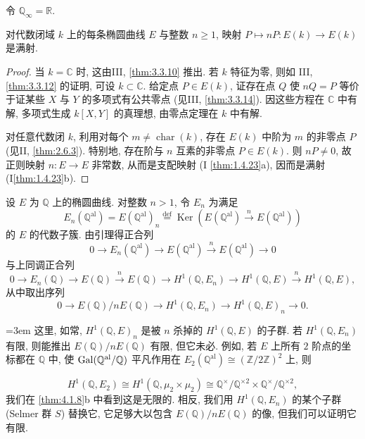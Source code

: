 令 $\mathbb{Q}_\infty = \mathbb{R}$.

\begin{lemma} \label{thm:4.2.1} 
对代数闭域 $k$ 上的每条椭圆曲线 $E$ 与整数 $n\ge 1$, 映射 $P\mapsto nP\colon E(k)\to E(k)$ 是满射.
\end{lemma}

\begin{proof}
当 $k = \mathbb{C}$ 时, 这由III, \ref{thm:3.3.10} 推出. 若 $k$ 特征为零, 则如 III, \ref{thm:3.3.12} 的证明, 可设 $k\subset\mathbb{C}$. 给定点 $P\in E(k)$, 证存在点 $Q$ 使 $nQ = P$ 等价于证某些 $X$ 与 $Y$ 的多项式有公共零点 (见III, \ref{thm:3.3.14}). 因这些方程在 $\mathbb{C}$ 中有解, 多项式生成 $k[X, Y]$ 的真理想, 由零点定理在 $k$ 中有解.

对任意代数闭 $k$, 利用对每个 $m\neq\operatorname{char}(k)$, 存在 $E(k)$ 中阶为 $m$ 的非零点 $P$ (见II, \ref{thm:2.6.3}). 特别地, 存在阶与 $n$ 互素的非零点 $P\in E(k)$. 则 $nP\neq 0$, 故正则映射 $n\colon E\to E$ 非常数, 从而是支配映射 (I \ref{thm:1.4.23}a), 因而是满射 (I\ref{thm:1.4.23}b).
\end{proof}

设 $E$ 为 $\mathbb{Q}$ 上的椭圆曲线. 对整数 $n > 1$, 令 $E_n$ 为满足
\[
E_n(\mathbb{Q}^{\mathrm{al}}) = E(\mathbb{Q}^{\mathrm{al}})_n \overset{\text{def}}{=} \operatorname{Ker}(E(\mathbb{Q}^{\mathrm{al}})\xrightarrow{n}E(\mathbb{Q}^{\mathrm{al}}))
\]
的 $E$ 的代数子簇. 由引理得正合列
\[
0\to E_n(\mathbb{Q}^{\mathrm{al}})\to E(\mathbb{Q}^{\mathrm{al}})\xrightarrow{n}E(\mathbb{Q}^{\mathrm{al}})\to 0
\]
与上同调正合列
\[
0\to E_n(\mathbb{Q})\to E(\mathbb{Q})\xrightarrow{n}E(\mathbb{Q})\to H^1(\mathbb{Q}, E_n)\to H^1(\mathbb{Q}, E)\xrightarrow{n}H^1(\mathbb{Q}, E),
\]
从中取出序列
\begin{equation} \label{eq:28}
\boxed{0\to E(\mathbb{Q})/nE(\mathbb{Q})\to H^1(\mathbb{Q}, E_n)\to H^1(\mathbb{Q}, E)_n\to 0.}
\tag{28}
\end{equation}
{\emergencystretch=3em 这里, 如常, $H^1(\mathbb{Q}, E)_n$ 是被 $n$ 杀掉的 $H^1(\mathbb{Q}, E)$ 的子群. 若 $H^1(\mathbb{Q}, E_n)$ 有限, 则能推出 $E(\mathbb{Q})/nE(\mathbb{Q})$ 有限, 但它未必. 例如, 若 $E$ 上所有 $2$ 阶点的坐标都在 $\mathbb{Q}$ 中, 使 $\operatorname{Gal}(\mathbb{Q}^{\mathrm{al}}/\mathbb{Q})$ 平凡作用在 $E_2(\mathbb{Q}^{\mathrm{al}})\cong(\mathbb{Z}/2\mathbb{Z})^2$ 上, 则\par}
\[
H^1(\mathbb{Q}, E_2)\cong H^1(\mathbb{Q}, \mu_2\times\mu_2)\cong\mathbb{Q}^{\times}/\mathbb{Q}^{\times2}\times\mathbb{Q}^{\times}/\mathbb{Q}^{\times2},
\]
我们在 \ref{thm:4.1.8}b 中看到这是无限的. 相反, 我们用 $H^1(\mathbb{Q}, E_n)$ 的某个子群 (Selmer 群 $S$) 替换它, 它足够大以包含 $E(\mathbb{Q})/nE(\mathbb{Q})$ 的像, 但我们可以证明它有限.

